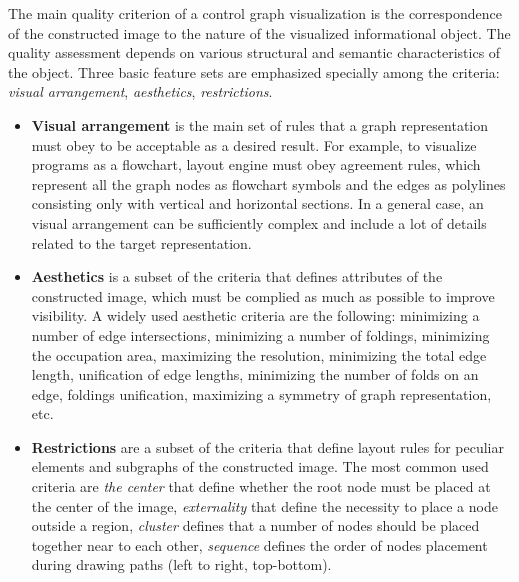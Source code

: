 \documentclass[conference]{IEEEtran}
\begin{document}
The main quality criterion of a control graph visualization is the correspondence of the constructed image to the nature of the visualized informational object.  The quality assessment depends on various structural and semantic characteristics of the object.  Three basic feature sets are emphasized specially among the criteria: \emph{visual arrangement}, \emph{aesthetics}, \emph{restrictions}.
\begin{itemize}
\item []\textbf{Visual arrangement} is the main set of rules that a graph representation must obey to be acceptable as a desired result.  For example, to visualize programs as a flowchart, layout engine must obey agreement rules, which represent all the graph nodes as flowchart symbols and the edges as polylines consisting only with vertical and horizontal sections.  In a general case, an visual arrangement can be sufficiently complex and include a lot of details related to the target representation.
\item []\textbf{Aesthetics} is a subset of the criteria that defines attributes of the constructed image, which must be complied as much as possible to improve visibility.  A widely used aesthetic criteria are the following: minimizing a number of edge intersections, minimizing a number of foldings, minimizing the occupation area, maximizing the resolution, minimizing the total edge length, unification of edge lengths, minimizing the number of folds on an edge, foldings unification, maximizing a symmetry of graph representation, etc. %
\item []\textbf{Restrictions} are a subset of the criteria that define layout rules for peculiar elements and subgraphs of the constructed image.  The most common used criteria are \emph{the center} that define whether the root node must be placed at the center of the image, \emph{externality} that define the necessity to place a node outside a region, \emph{cluster} defines that a number of nodes should be placed together near to each other, \emph{sequence} defines the order of nodes placement during drawing paths (left to right, top-bottom).
\end{itemize}
\end{document}
